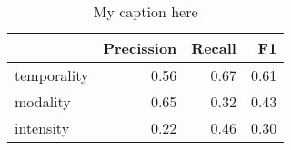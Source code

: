 \begin{table}[!ht]
\centering
\begin{tabular}{lrrr}
\toprule
{} &  Precission &  Recall &   F1 \\
\midrule
temporality &        0.56 &    0.67 & 0.61 \\
modality    &        0.65 &    0.32 & 0.43 \\
intensity   &        0.22 &    0.46 & 0.30 \\
\bottomrule
\end{tabular}
\caption{My caption here}
\label{tab:MOOD_ASSESMENT-ocd-combined-F1}
\end{table}